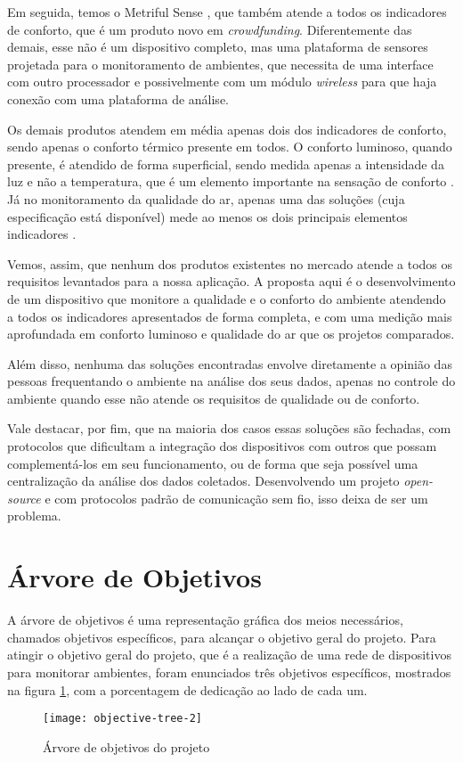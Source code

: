 \documentclass[../monografia.tex]{subfiles}
\begin{document}
Em seguida, temos o Metriful Sense \cite{metriful}, que também atende a todos os indicadores de conforto, que é um produto novo em \textit{crowdfunding}. Diferentemente das demais, esse não é um dispositivo completo, mas uma plataforma de sensores projetada para o monitoramento de ambientes, que necessita de uma interface com outro processador e possivelmente com um módulo \textit{wireless} para que haja conexão com uma plataforma de análise. 

Os demais produtos atendem em média apenas dois dos indicadores de conforto, sendo apenas o conforto térmico presente em todos. O conforto luminoso, quando presente, é atendido de forma superficial, sendo medida apenas a intensidade da luz e não a temperatura, que é um elemento importante na sensação de conforto \cite{VisualComfort}. Já no monitoramento da qualidade do ar, apenas uma das soluções \cite{ECOMLITE} (cuja especificação está disponível) mede ao menos os dois principais elementos indicadores \cite{AirQuality}. 

Vemos, assim, que nenhum dos produtos existentes no mercado atende a todos os requisitos levantados para a nossa aplicação. A proposta aqui é o desenvolvimento de um dispositivo que monitore a qualidade e o conforto do ambiente atendendo a todos os indicadores apresentados de forma completa, e com uma medição mais aprofundada em conforto luminoso e qualidade do ar que os projetos comparados. 

Além disso, nenhuma das soluções encontradas envolve diretamente a opinião das pessoas frequentando o ambiente na análise dos seus dados, apenas no controle do ambiente quando esse não atende os requisitos de qualidade ou de conforto. 

Vale destacar, por fim, que na maioria dos casos essas soluções são fechadas, com protocolos que dificultam a integração dos dispositivos com outros que possam complementá-los em seu funcionamento, ou de forma que seja possível uma centralização da análise dos dados coletados. Desenvolvendo um projeto \textit{open-source} e com protocolos padrão de comunicação sem fio, isso deixa de ser um problema. 

\section{Árvore de Objetivos} 
A árvore de objetivos é uma representação gráfica dos meios necessários, chamados objetivos específicos, para alcançar o objetivo geral do projeto. Para atingir o objetivo geral do projeto, que é a realização de uma rede de dispositivos para monitorar ambientes, foram enunciados três objetivos específicos, mostrados na figura \ref{fig:objective-tree}, com a porcentagem de dedicação ao lado de cada um.

\begin{figure}[h!]
\texttt{[image: objective-tree-2]}
\centering
\caption{Árvore de objetivos do projeto}
\label{fig:objective-tree}
\end{figure}
\end{document}
